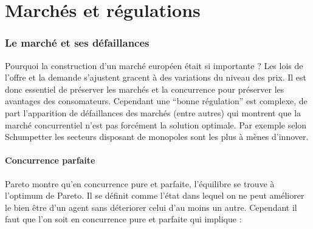 \part{Marchés et régulations} %
\label{prt:marches_et_regulations}

\section{Le marché et ses défaillances} %
\label{sec:le_marche_et_ses_defaillances}

Pourquoi la construction d'un marché européen était si importante ? Les lois de l'offre et la demande s'ajustent gracent à des variations du niveau des prix. Il est donc essentiel de préserver les marchés et la concurrence pour préserver les avantages des consomateurs. Cependant une ``bonne régulation'' est complexe, de part l'apparition de défaillances des marchés (entre autres) qui montrent que la marché concurrentiel n'est pas forcément la solution optimale. Par exemple selon Schumpetter les secteurs disposant de monopoles sont les plus à mènes d'innover.

\subsection{Concurrence parfaite} %
\label{sub:concurrence_parfaite}

Pareto montre qu'en concurrence pure et parfaite, l'équilibre se trouve à l'optimum de Pareto. Il se définit comme l'état dans lequel on ne peut améliorer le bien être d'un agent sans déteriorer celui d'au moins un autre. Cependant il faut que l'on soit en concurrence pure et parfaite qui implique : 

